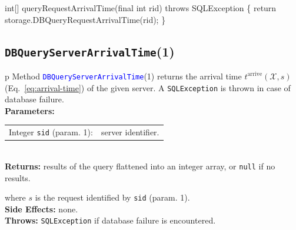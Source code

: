 \nwenddocs{}\endmoddef{}
int[] queryRequestArrivalTime(final int rid) throws SQLException \{
  return storage.DBQueryRequestArrivalTime(rid);
\}
\eatline
{}\nwendcode{}\nwdocspar
\subsection{{\tt{}\protect{}DBQueryServerArrivalTime}(1)}
\begin{tabular}{p{\textwidth}}
\toprule
{}
Method \textcolor{blue}{{\tt{}\protect{}DBQueryServerArrivalTime}}(1) returns the
arrival time $t^\textrm{arrive}(\mathcal{X},s)$
(Eq.~\ref{eq:arrival-time}) of the given server.
A {\tt{}SQLException} is thrown in case of database failure.\\
\midrule
\textbf{Parameters:}\\
\begin{tabular}{lp{116mm}}
Integer {\tt{}sid} (param. 1):&server identifier.
\end{tabular}\\
\textbf{Returns:} results of the query flattened into an integer array,
or {\tt{}null} if no results.


where $s$ is the request identified by {\tt{}sid} (param. 1).\\
\textbf{Side Effects:} none.\\
\textbf{Throws:} {\tt{}SQLException} if database failure is encountered.\\
\bottomrule
\end{tabular}
